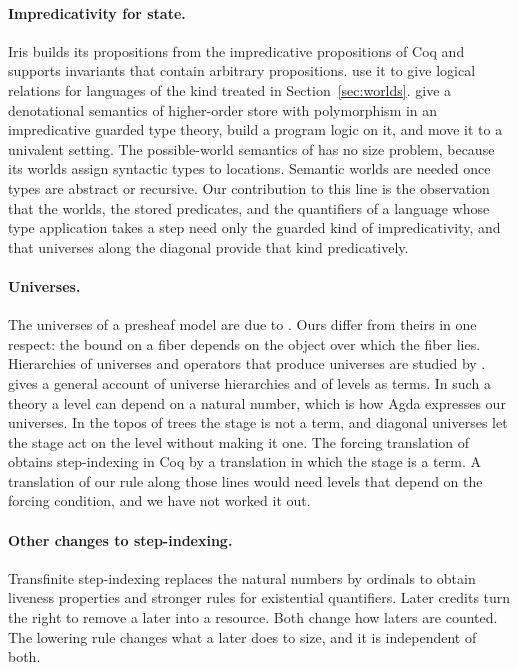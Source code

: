 \documentclass[acmsmall,nonacm,screen]{acmart}
\begin{document}
\paragraph{Impredicativity for state.}
Iris \citep{Iris2018} builds its propositions from the impredicative propositions of Coq and
supports invariants that contain arbitrary propositions. \citet{Timany2024} use it to give
logical relations for languages of the kind treated in Section~\ref{sec:worlds}.
\citet{SGB2022} give a denotational semantics of higher-order store with polymorphism in an
impredicative guarded type theory, \citet{Tulip2023} build a program logic on it, and
\citet{SGB2024} move it to a univalent setting. The possible-world semantics of
\citet{Levy2002} has no size problem, because its worlds assign syntactic types to
locations. Semantic worlds are needed once types are abstract or recursive. Our
contribution to this line is the observation that the worlds, the stored predicates, and
the quantifiers of a language whose type application takes a step need only the guarded
kind of impredicativity, and that universes along the diagonal provide that kind
predicatively.

\paragraph{Universes.}
The universes of a presheaf model are due to \citet{HofmannStreicher1997}. Ours differ from
theirs in one respect: the bound on a fiber depends on the object over which the fiber
lies. Hierarchies of universes and operators that produce universes are studied by
\citet{Palmgren1998}. \citet{Kovacs2022} gives a general account of universe hierarchies and
of levels as terms. In such a theory a level can depend on a natural number, which is how
Agda expresses our universes. In the topos of trees the stage is not a term, and diagonal
universes let the stage act on the level without making it one. The forcing translation of
\citet{JTS2012} obtains step-indexing in Coq by a translation in which the stage is a
term. A translation of our rule along those lines would need levels that depend on the
forcing condition, and we have not worked it out.

\paragraph{Other changes to step-indexing.}
Transfinite step-indexing \citep{SKD2021,TransfiniteIris2021} replaces the natural numbers by
ordinals to obtain liveness properties and stronger rules for existential quantifiers.
Later credits \citep{LaterCredits2022} turn the right to remove a later into a resource. Both
change how laters are counted. The lowering rule changes what a later does to size, and it
is independent of both.
\end{document}
